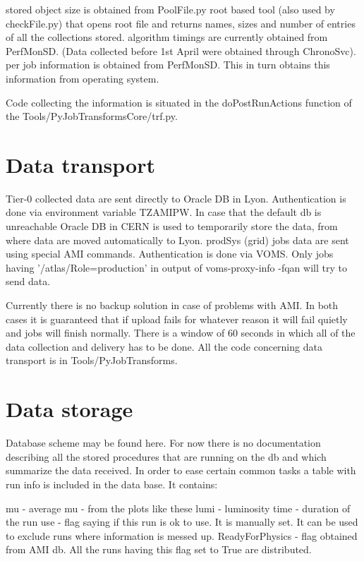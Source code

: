 \documentclass{atlasnote}
\begin{document}
    stored object size is obtained from PoolFile.py root based tool (also used by checkFile.py) that opens root file and returns names, sizes and number of entries of all the collections stored.
    algorithm timings are currently obtained from PerfMonSD. (Data collected before 1st April were obtained through ChronoSvc).
    per job information is obtained from PerfMonSD. This in turn obtains this information from operating system. 

Code collecting the information is situated in the doPostRunActions function of the Tools/PyJobTransformsCore/trf.py.

\section{Data transport}

    Tier-0 collected data are sent directly to Oracle DB in Lyon. Authentication is done via environment variable TZAMIPW. In case that the default db is unreachable Oracle DB in CERN is used to temporarily store the data, from where data are moved automatically to Lyon.
    prodSys (grid) jobs data are sent using special AMI commands. Authentication is done via VOMS. Only jobs having '/atlas/Role=production' in output of voms-proxy-info -fqan will try to send data. 

Currently there is no backup solution in case of problems with AMI. In both cases it is guaranteed that if upload fails for whatever reason it will fail quietly and jobs will finish normally. There is a window of 60 seconds in which all of the data collection and delivery has to be done. All the code concerning data transport is in Tools/PyJobTransforms.

\section{Data storage}
Database scheme may be found here. For now there is no documentation describing all the stored procedures that are running on the db and which summarize the data received. In order to ease certain common tasks a table with run info is included in the data base. It contains:

    mu - average mu - from the plots like these
    lumi - luminosity
    time - duration of the run
    use - flag saying if this run is ok to use. It is manually set. It can be used to exclude runs where information is messed up.
    ReadyForPhysics - flag obtained from AMI db. All the runs having this flag set to True are distributed. 
\end{document}
